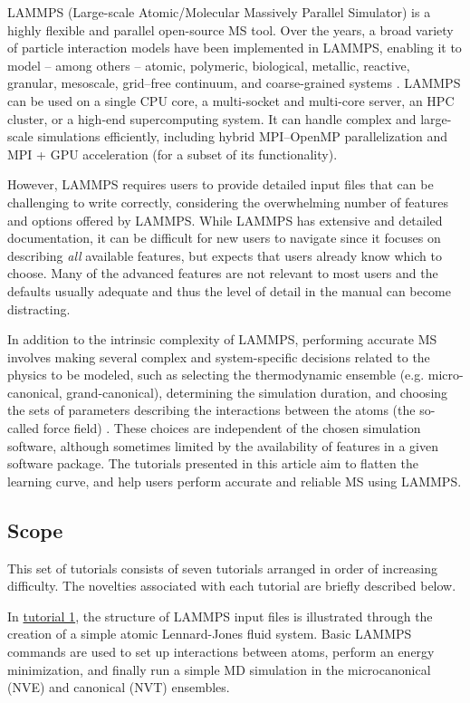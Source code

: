 \documentclass[9pt,tutorial]{livecoms}
\begin{document}
LAMMPS (Large-scale Atomic/Molecular Massively Parallel Simulator)
\cite{lammps_home} is a highly flexible and parallel open-source MS
tool.  Over the years, a broad variety of particle interaction models
have been implemented in LAMMPS, enabling it to model -- among others --
atomic, polymeric, biological, metallic, reactive, granular, mesoscale,
grid--free continuum, and coarse-grained systems
\cite{thompson2022lammps}.  LAMMPS can be used on a single CPU core, a
multi-socket and multi-core server, an HPC cluster, or a high-end
supercomputing system.  It can handle complex and large-scale
simulations efficiently, including hybrid MPI--OpenMP parallelization
and MPI + GPU acceleration (for a subset of its functionality).

However, LAMMPS requires users to provide detailed input files that can
be challenging to write correctly, considering the overwhelming number
of features and options offered by LAMMPS.  While LAMMPS has
extensive and detailed documentation, it can be difficult for new users
to navigate since it focuses on describing \emph{all} available
features, but expects that users already know which to choose.  Many of
the advanced features are not relevant to most users and the defaults
usually adequate and thus the level of detail in the manual can become
distracting.

In addition to the intrinsic complexity of LAMMPS, performing accurate
MS involves making several complex and system-specific decisions related
to the physics to be modeled, such as selecting the thermodynamic
ensemble (e.g. micro-canonical, grand-canonical), determining the
simulation duration, and choosing the sets of parameters describing the
interactions between the atoms (the so-called force field)
\cite{van2018validation}.  These choices are independent of the chosen
simulation software, although sometimes limited by the availability of
features in a given software package.  The tutorials presented in this
article aim to flatten the learning curve, and help users perform
accurate and reliable MS using LAMMPS.

\subsection{Scope}

This set of tutorials consists of seven tutorials arranged in order of
increasing difficulty.  The novelties associated with each tutorial are
briefly described below.

In \hyperref[lennard-jones-label]{tutorial 1}, the structure of LAMMPS
input files is illustrated through the creation of a simple atomic
Lennard-Jones fluid system.  Basic LAMMPS commands are used to set up
interactions between atoms, perform an energy minimization, and finally
run a simple MD simulation in the microcanonical (NVE) and canonical (NVT)
ensembles.
\end{document}
